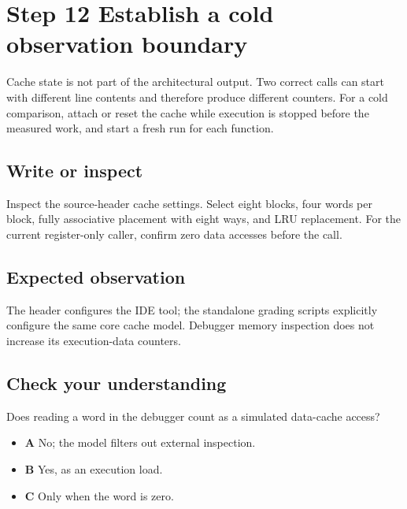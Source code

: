 \section{Step 12 Establish a cold observation boundary}\label{transpose-s12}

Cache state is not part of the architectural output. Two correct calls can start with different line contents and therefore produce different counters. For a cold comparison, attach or reset the cache while execution is stopped before the measured work, and start a fresh run for each function.

\subsection{Write or inspect}
Inspect the source-header cache settings. Select eight blocks, four words per block, fully associative placement with eight ways, and LRU replacement. For the current register-only caller, confirm zero data accesses before the call.

\subsection{Expected observation}
The header configures the IDE tool; the standalone grading scripts explicitly configure the same core cache model. Debugger memory inspection does not increase its execution-data counters.

\subsection{Check your understanding}
Does reading a word in the debugger count as a simulated data-cache access?

\begin{itemize}
  \item \textbf{A} No; the model filters out external inspection.
  \item \textbf{B} Yes, as an execution load.
  \item \textbf{C} Only when the word is zero.
\end{itemize}
